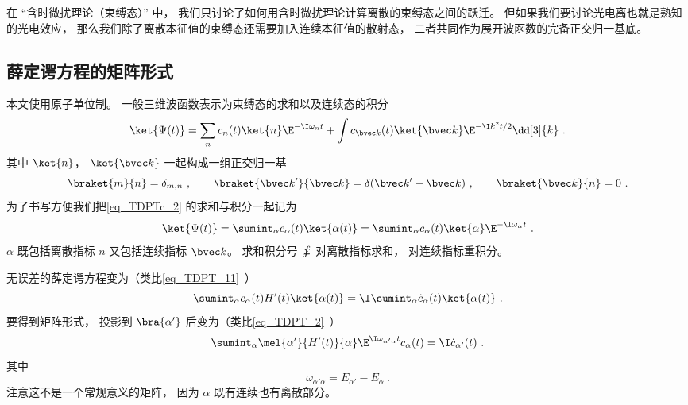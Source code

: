 

在 “含时微扰理论（束缚态）” 中， 我们只讨论了如何用含时微扰理论计算离散的束缚态之间的跃迁。 但如果我们要讨论光电离也就是熟知的光电效应， 那么我们除了离散本征值的束缚态还需要加入连续本征值的散射态， 二者共同作为展开波函数的完备正交归一基底。

\subsection{薛定谔方程的矩阵形式}
本文使用原子单位制。 一般三维波函数表示为束缚态的求和以及连续态的积分
\begin{equation}\label{eq_TDPTc_2}
\ket{\Psi(t)} = \sum_n c_n(t)\ket{n}\E^{-\I\omega_n t} + \int c_{\bvec k}(t)\ket{\bvec k}\E^{-\I k^2 t/2} \dd[3]{k}~.
\end{equation}
其中 $\ket{n}$， $\ket{\bvec k}$ 一起构成一组正交归一基
\begin{equation}
\braket{m}{n} = \delta_{m,n}~, \qquad
\braket{\bvec k'}{\bvec k} = \delta(\bvec k' - \bvec k)~, \qquad
\braket{\bvec k}{n} = 0~.
\end{equation}
为了书写方便我们把\autoref{eq_TDPTc_2} 的求和与积分一起记为
\begin{equation}
\ket{\Psi(t)} = \sumint_\alpha c_\alpha(t) \ket{\alpha(t)} = \sumint_\alpha c_\alpha(t) \ket{\alpha}\E^{-\I\omega_\alpha t} ~.
\end{equation}
$\alpha$ 既包括离散指标 $n$ 又包括连续指标 $\bvec k$。 求和积分号 $\displaystyle\sumint$ 对离散指标求和， 对连续指标重积分。

无误差的薛定谔方程变为（类比\autoref{eq_TDPT_11}~）
\begin{equation}
\sumint_\alpha c_\alpha(t) H'(t) \ket{\alpha(t)} = \I \sumint_\alpha \dot c_\alpha(t) \ket{\alpha(t)}~.
\end{equation}
要得到矩阵形式， 投影到 $\bra{\alpha'}$ 后变为（类比\autoref{eq_TDPT_2}~）
\begin{equation}
\sumint_\alpha \mel{\alpha'}{H'(t)}{\alpha} \E^{\I \omega_{\alpha'\alpha} t} c_\alpha(t)
= \I \dot c_{\alpha'} (t)~.
\end{equation}
其中
\begin{equation}
\omega_{\alpha'\alpha} = E_{\alpha'}-E_\alpha~.
\end{equation}
注意这不是一个常规意义的矩阵， 因为 $\alpha$ 既有连续也有离散部分。

